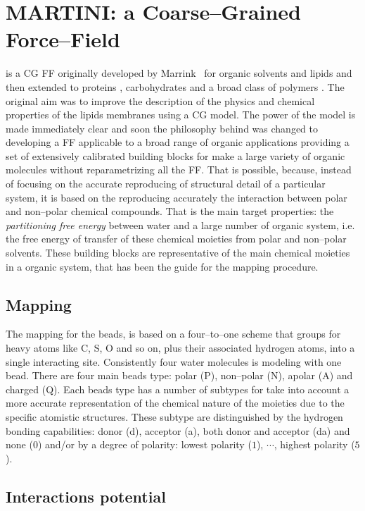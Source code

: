 \section{MARTINI: a Coarse--Grained Force--Field}
\martini is a \ac{CG} \ac{FF} originally developed by Marrink \etal\, \cite{Martini} for organic solvents and lipids and then extended to proteins \cite{MartiniProtein}, carbohydrates \cite{MartiniCarbo} and a broad class of polymers \cite{MartiniPolymers}. The original aim was to improve the description of the physics and chemical properties of the lipids membranes using a \ac{CG} model. The power of the model is made immediately clear and soon the philosophy behind was changed to developing a \ac{FF} applicable to a broad range of organic applications providing a set of extensively calibrated building blocks for make a large variety of organic molecules without reparametrizing all the \ac{FF}. That is possible, because, instead of focusing on the accurate reproducing of structural detail of a particular system, it is based on the reproducing accurately the interaction between polar and non--polar chemical compounds. That is the main target properties: the \textit{partitioning free energy} between water and a large number of organic system, i.e. the free energy of transfer of these chemical moieties from polar and non--polar solvents. These building blocks are representative of the main chemical moieties in a organic system, that has been the guide for the mapping procedure.

\subsection{Mapping}
The mapping for the \martini beads, is based on a four--to--one scheme that groups for heavy atoms like C, S, O and so on, plus their associated hydrogen atoms, into a single interacting site. Consistently four water molecules is modeling with one \martini bead. There are four main beads type: polar (P), non--polar (N), apolar (A) and charged (Q). Each beads type has a number of subtypes for take into account a more accurate representation of the chemical nature of the moieties due to the specific atomistic structures. These subtype are distinguished by the hydrogen bonding capabilities: donor (d), acceptor (a), both donor and acceptor (da) and none ($0$) and/or by a degree of polarity: lowest polarity ($1$), $\cdots$, highest polarity ($5$).

\subsection{Interactions potential}
